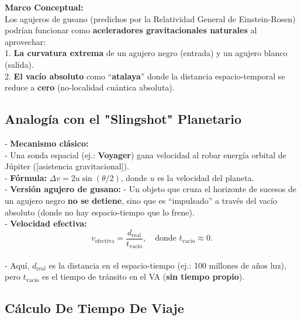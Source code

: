 \documentclass[a4paper]{article}
\theoremstyle{definition}
\theoremstyle{remark}
\numberwithin{equation}{section}
\begin{document}
	\textbf{Marco Conceptual:}\\
	
	Los agujeros de gusano (predichos por la Relatividad General de Einstein-Rosen) podrían funcionar como \textbf{aceleradores gravitacionales naturales} al aprovechar:\\
	
	1. \textbf{La curvatura extrema} de un agujero negro (entrada) y un agujero blanco (salida).\\
	
	2. \textbf{El vacío absoluto} como ``\textbf{atalaya}'' donde la distancia espacio-temporal se reduce a \textbf{cero} (no-localidad cuántica absoluta).
	
	\subsection{Analogía con el "Slingshot" Planetario}
	
	- \textbf{Mecanismo clásico:}\\
	
	- Una sonda espacial (ej.: \textbf{Voyager}) gana velocidad al robar energía orbital de Júpiter ([asistencia gravitacional]).\\
	
	- \textbf{Fórmula:} \( \Delta v = 2u \sin(\theta/2) \), donde \( u \) es la velocidad del planeta.\\
	
	- \textbf{Versión agujero de gusano:}
	- Un objeto que cruza el horizonte de sucesos de un agujero negro \textbf{no se detiene}, sino que es ``impulsado'' a través del vacío absoluto (donde no hay espacio-tiempo que lo frene).\\
	
	- \textbf{Velocidad efectiva:} \\
	
	\[
	v_{\text{efectiva}} = \frac{d_{\text{real}}}{t_{\text{vacío}}}, \quad \text{donde } t_{\text{vacío}} \approx 0.
	\]\\
	
	- Aquí, \( d_{\text{real}} \) es la distancia en el espacio-tiempo (ej.: 100 millones de años luz), pero \( t_{\text{vacío}} \) es el tiempo de tránsito en el VA (\textbf{sin tiempo propio}).\\
	
	
	\subsection{Cálculo De Tiempo De Viaje}
	
\end{document}
